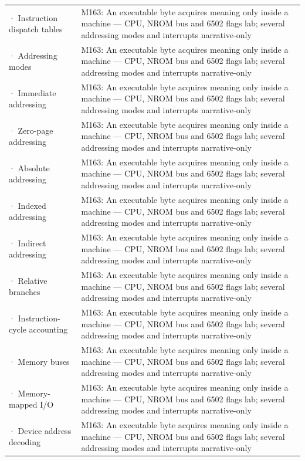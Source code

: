 {\begin{longtable}[]{@{}
  >{\raggedright\arraybackslash}p{}
  >{\raggedright\arraybackslash}p{}@{}}
2708 · Instruction dispatch tables & M163: An executable byte acquires meaning only inside a machine --- CPU, NROM bus and 6502 flags lab; several addressing modes and interrupts narrative-only \\
2709 · Addressing modes & M163: An executable byte acquires meaning only inside a machine --- CPU, NROM bus and 6502 flags lab; several addressing modes and interrupts narrative-only \\
2710 · Immediate addressing & M163: An executable byte acquires meaning only inside a machine --- CPU, NROM bus and 6502 flags lab; several addressing modes and interrupts narrative-only \\
2711 · Zero-page addressing & M163: An executable byte acquires meaning only inside a machine --- CPU, NROM bus and 6502 flags lab; several addressing modes and interrupts narrative-only \\
2712 · Absolute addressing & M163: An executable byte acquires meaning only inside a machine --- CPU, NROM bus and 6502 flags lab; several addressing modes and interrupts narrative-only \\
2713 · Indexed addressing & M163: An executable byte acquires meaning only inside a machine --- CPU, NROM bus and 6502 flags lab; several addressing modes and interrupts narrative-only \\
2714 · Indirect addressing & M163: An executable byte acquires meaning only inside a machine --- CPU, NROM bus and 6502 flags lab; several addressing modes and interrupts narrative-only \\
2715 · Relative branches & M163: An executable byte acquires meaning only inside a machine --- CPU, NROM bus and 6502 flags lab; several addressing modes and interrupts narrative-only \\
2716 · Instruction-cycle accounting & M163: An executable byte acquires meaning only inside a machine --- CPU, NROM bus and 6502 flags lab; several addressing modes and interrupts narrative-only \\
2717 · Memory buses & M163: An executable byte acquires meaning only inside a machine --- CPU, NROM bus and 6502 flags lab; several addressing modes and interrupts narrative-only \\
2718 · Memory-mapped I/O & M163: An executable byte acquires meaning only inside a machine --- CPU, NROM bus and 6502 flags lab; several addressing modes and interrupts narrative-only \\
2719 · Device address decoding & M163: An executable byte acquires meaning only inside a machine --- CPU, NROM bus and 6502 flags lab; several addressing modes and interrupts narrative-only \\

\end{longtable}}
